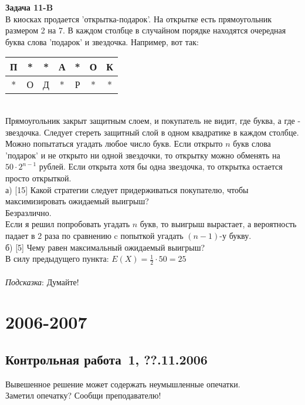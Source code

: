 \documentclass[pdftex,12pt,a4paper]{article}
\begin{document}
{\bf Задача 11-B} \\
В киосках продается 'открытка-подарок'. На открытке есть
прямоугольник размером 2 на 7. В каждом столбце в случайном
порядке находятся очередная буква слова 'подарок' и звездочка.
Например, вот так: \\
\begin{tabular}{|c|c|c|c|c|c|c|}
  \hline
  П & * & * & А & * & О & К \\
  \hline
  * & О & Д & * & Р & * & * \\
  \hline
\end{tabular} \\
Прямоугольник закрыт защитным слоем, и покупатель не видит, где
буква, а где - звездочка. Следует стереть защитный слой в одном
квадратике в каждом столбце. Можно попытаться угадать любое число
букв. Если открыто $n$ букв слова 'подарок' и не открыто ни одной
звездочки, то открытку можно обменять на $50\cdot 2^{n-1}$ рублей.
Если открыта хотя бы одна звездочка, то открытка
остается просто открыткой. \\
а) [15] Какой стратегии следует придерживаться покупателю, чтобы
максимизировать ожидаемый выигрыш? \\
Безразлично. \\
Если я решил попробовать угадать $n$ букв, то выигрыш вырастает, а
вероятность падает в 2 раза по сравнению c попыткой угадать $(n-1)$-у букву.  \\
б) [5] Чему равен максимальный ожидаемый выигрыш? \\
В силу предыдущего пункта: $E(X)=\frac{1}{2}\cdot 50=25$ \\ \\
\emph{Подсказка}: Думайте! \\




\section{2006-2007}


\subsection{Контрольная работа \No\,1, ??.11.2006}

Вывешенное решение может содержать неумышленные опечатки. \\
Заметил опечатку? Сообщи преподавателю! \\
\end{document}
